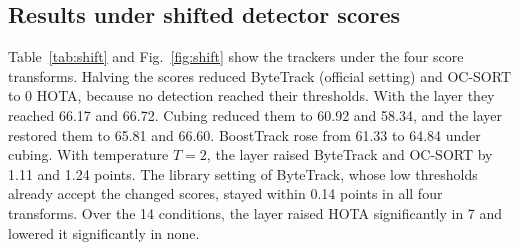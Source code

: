 \documentclass[pdflatex,sn-mathphys-num]{sn-jnl}
\begin{document}
\subsection{Results under shifted detector scores}\label{sec:shift}
Table~\ref{tab:shift} and Fig.~\ref{fig:shift} show the trackers under the
four score transforms. Halving the scores reduced ByteTrack (official setting)
and OC-SORT to 0 HOTA, because no detection reached their thresholds. With the
layer they reached 66.17 and 66.72. Cubing reduced them to 60.92 and 58.34,
and the layer restored them to 65.81 and 66.60. BoostTrack rose from 61.33 to
64.84 under cubing. With temperature $T=2$, the layer raised ByteTrack and
OC-SORT by 1.11 and 1.24 points. The library setting of ByteTrack, whose low
thresholds already accept the changed scores, stayed within 0.14 points in all
four transforms. Over the 14 conditions, the layer raised HOTA significantly
in 7 and lowered it significantly in none.
\end{document}
